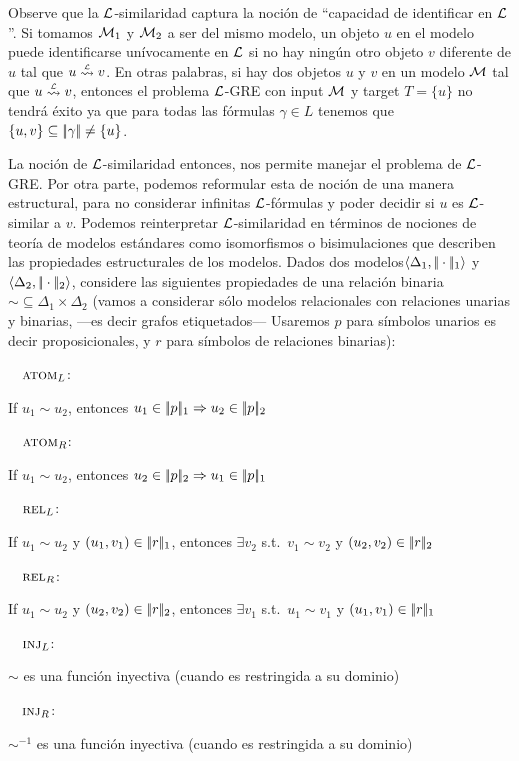 Observe que la $\mathcal{L}$-similaridad captura la noci\'on de ``capacidad de identificar en $\mathcal{L}$''. Si tomamos $\mathcal{M}_1$ y $\mathcal{M}_2$ a ser del mismo modelo, un objeto $u$ en el modelo puede identificarse un\'ivocamente en $\mathcal{L}$ si no hay ning\'un otro objeto $v$ diferente de $u$ tal que $u \simil{\+L} v$. En otras palabras, si hay dos objetos $u$ y $v$ en un modelo $\mathcal{M}$  tal que
$u \simil{\+L} v$, entonces el problema $\mathcal{L}$-GRE con input $\mathcal{M}$ y target $T=\{u\}$ no tendr\'a \'exito ya que para todas las f\'ormulas $\gamma \in L$ tenemos que $\{u,v\} \subseteq |\!|\gamma|\!| \not = \{u\}$.





La noci\'on de $\mathcal{L}$-similaridad entonces, nos permite manejar el problema de  $\mathcal{L}$-GRE.
Por otra parte, podemos reformular esta de noci\'on de una manera estructural, para no considerar infinitas $\mathcal{L}$-f\'ormulas y poder decidir si $u$ es $\mathcal{L}$-similar a $v$. Podemos reinterpretar $\mathcal{L}$-similaridad en t\'erminos de nociones de teor\'ia de modelos est\'andares
como isomorfismos o bisimulaciones que describen las propiedades estructurales de los modelos. Dados dos modelos$\langle \Delta_1, |\!|\cdot|\!|_1 \rangle$ y $\langle \Delta_2,
|\!|\cdot|\!|_2 \rangle$, considere las siguientes
propiedades de una relaci\'on binaria ${\sim} \subseteq \Delta_1 \times \Delta_2$ 
(vamos a considerar s\'olo modelos relacionales con relaciones unarias y binarias, ---es decir grafos etiquetados--- Usaremos $p$ para s\'imbolos unarios es decir proposicionales, y $r$ para s\'imbolos de relaciones binarias):
\smallskip 

\newcommand{\simdef}[2]{\noindent\ \ #1\hfill:\ \parbox[t]{.87\textwidth}{#2}\par}

\simdef{$\textsc{atom}_L$}{If $u_1{\sim} u_2$, entonces $u_1 \in |\!|p|\!|_1 \Rightarrow u_2 \in |\!|p|\!|_2$}
\simdef{$\textsc{atom}_R$}{If $u_1{\sim} u_2$, entonces $u_2 \in |\!|p|\!|_2 \Rightarrow u_1 \in |\!|p|\!|_1$}
\simdef{$\textsc{rel}_L$}{If $u_1{\sim} u_2$ y $(u_1,v_1) \in |\!|r|\!|_1$, entonces $\exists v_2$ s.t.\ $v_1{\sim}v_2$
  y $(u_2,v_2) \in |\!|r|\!|_2$}
\simdef{$\textsc{rel}_R$}{If $u_1{\sim}u_2$ y $(u_2,v_2) \in |\!|r|\!|_2$, entonces $\exists v_1$ s.t.\ $u_1{\sim}v_1$ y
 $(u_1,v_1) \in |\!|r|\!|_1$}
\simdef{$\textsc{inj}_L\space$}{$\sim$ es una funci\'on inyectiva (cuando es restringida a su dominio)}
\simdef{$\textsc{inj}_R\space$}{$\sim^{-1}$ es una funci\'on inyectiva (cuando es restringida a su dominio)}
\smallskip

